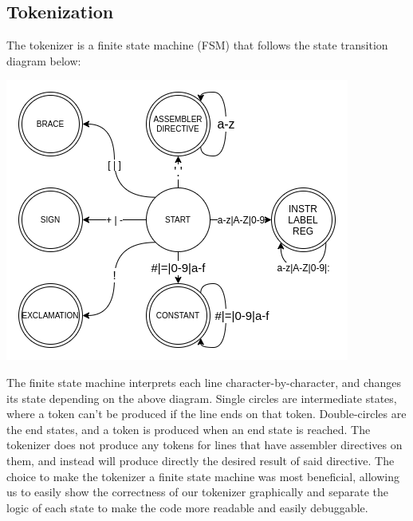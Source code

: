 \documentclass[11pt]{article}
\begin{document}
\subsection*{Tokenization}
The tokenizer is a finite state machine (FSM) that follows the state transition diagram below:
\begin{center}
	\includegraphics[scale=0.6]{fsmDiagram}
\end{center}
The finite state machine interprets each line character-by-character, and changes its state depending on the above diagram. Single circles are intermediate states, where a token can't be produced if the line ends on that token. Double-circles are the end states, and a token is produced when an end state is reached. The tokenizer does not produce any tokens for lines that have assembler directives on them, and instead will produce directly the desired result of said directive.
The choice to make the tokenizer a finite state machine was most beneficial, allowing us to easily show the correctness of our tokenizer graphically and separate the logic of each state to make the code more readable and easily debuggable.  
\end{document}
